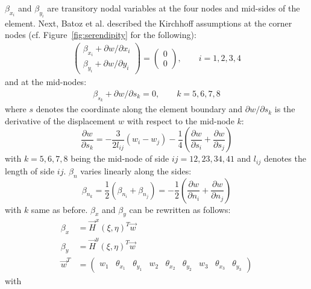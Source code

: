   $\beta_{x_i}$ and $\beta_{y_i}$ are transitory nodal variables at the four nodes and mid-sides of the element.
  Next, Batoz et al. described the Kirchhoff assumptions at the corner nodes (cf. Figure~\ref{fig:serendipity} for the following):
  \begin{align}
  \begin{pmatrix}
  \beta_{x_i} + \partial w/\partial x_i \\
  \beta_{y_i} + \partial w/\partial y_i
  \end{pmatrix} = \begin{pmatrix}
  0\\0
  \end{pmatrix},\qquad i = 1,2,3,4
  \end{align}
  and at the mid-nodes:
  \begin{align}
  \beta_{s_k} + \partial w/\partial s_k = 0,\qquad k = 5,6,7,8
  \end{align}
  where $s$ denotes the coordinate along the element boundary and $\partial w/\partial s_k$ is the derivative of the displacement $w$ with respect to the mid-node $k$:
  \begin{equation}
  \frac{\partial w}{\partial s_k} = -\frac{3}{2 l_{ij}}(w_i-w_j) - \frac{1}{4}\left(\frac{\partial w}{\partial s_i} + \frac{\partial w}{\partial s_j}\right)
  \end{equation}
  with $k = 5,6,7,8$ being the mid-node of side $ij = 12, 23, 34, 41$ and $l_{ij}$ denotes the length of side $ij$.
  $\beta_n$ varies linearly along the sides:
  \begin{equation}
  \beta_{n_k} = \frac{1}{2}\left(\beta_{n_i} + \beta_{n_j}\right) = -\frac{1}{2} \left(\frac{\partial w}{\partial n_i} + \frac{\partial w}{\partial n_j}\right)
  \end{equation}
  with $k$ same as before.
  $\beta_x$ and $\beta_y$ can be rewritten as follows:
  \begin{align}
  \beta_x &= \vec{H}^x(\xi,\eta)^T \vec{w}\\
  \beta_y &= \vec{H}^y(\xi,\eta)^T \vec{w}\\
  \vec{w}^T &= \begin{pmatrix}
  w_1&\theta_{x_1}&\theta_{y_1}&w_2&\theta_{x_2}&\theta_{y_2}&w_3&\theta_{x_3}&\theta_{y_3}
  \end{pmatrix} \nonumber
  \end{align}
  with
